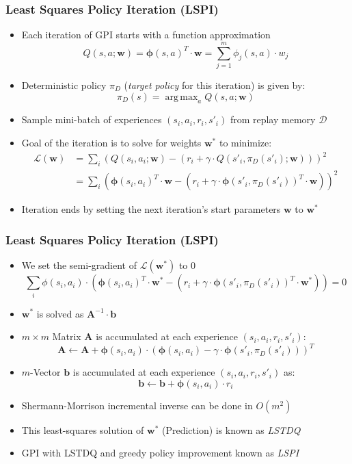 \documentclass[handout]{beamer}
\DeclareMathOperator*{\argmax}{arg\,max}
\begin{document}
\begin{frame}
\frametitle{Least Squares Policy Iteration (LSPI)}
\pause
\begin{itemize}[<+->]
\item Each iteration of GPI starts with a function approximation
$$Q(s,a; \bm{w}) = \bm{\phi}(s,a)^T \cdot \bm{w} = \sum_{j=1}^m \phi_j(s,a) \cdot w_j$$
\item Deterministic policy $\pi_D$ ({\em target policy} for this iteration) is given by:
$$\pi_D(s) = \argmax_a Q(s,a; \bm{w})$$
\item Sample mini-batch of experiences $(s_i,a_i,r_i,s'_i)$ from replay memory $\mathcal{D}$
\item Goal of the iteration is to solve for weights $\bm{w}^*$ to minimize:
\begin{align*}
\mathcal{L}(\bm{w}) & = \sum_i (Q(s_i,a_i; \bm{w}) - (r_i + \gamma \cdot Q(s'_i,\pi_D(s'_i); \bm{w})))^2\\
& = \sum_i (\bm{\phi}(s_i,a_i)^T \cdot \bm{w} - (r_i + \gamma \cdot \bm{\phi}(s'_i, \pi_D(s'_i))^T \cdot \bm{w}))^2
\end{align*}
\item Iteration ends by setting the next iteration's start parameters $\bm{w}$ to $\bm{w}^*$
\end{itemize}
\end{frame}

\begin{frame}
\frametitle{Least Squares Policy Iteration (LSPI)}
\pause
\begin{itemize}[<+->]
\item We set the semi-gradient of $\mathcal{L}(\bm{w}^*)$ to 0
\begin{equation}
\sum_i \phi(s_i,a_i) \cdot (\bm{\phi}(s_i,a_i)^T \cdot \bm{w}^* - (r_i + \gamma \cdot \bm{\phi}(s'_i, \pi_D(s'_i))^T \cdot \bm{w}^*)) = 0
\label{eq:lspi-loss-semi-gradient}
\end{equation}
\item $\bm{w}^*$ is solved as $\bm{A}^{-1} \cdot \bm{b}$
\item $m \times m$ Matrix $\bm{A}$ is accumulated at each experience $(s_i,a_i,r_i,s'_i)$:
$$ \bm{A} \leftarrow \bm{A} + \bm{\phi}(s_i, a_i) \cdot (\bm{\phi}(s_i, a_i) - \gamma \cdot \bm{\phi}(s'_i, \pi_D(s'_i)))^T $$
\item $m$-Vector $\bm{b}$ is accumulated at each experience $(s_i,a_i,r_i,s'_i)$ as:
$$\bm{b} \leftarrow \bm{b} + \bm{\phi}(s_i, a_i) \cdot r_i$$
\item Shermann-Morrison incremental inverse can be done in $O(m^2)$
\item This least-squares solution of $\bm{w}^*$ (Prediction) is known as {\em LSTDQ}
\item GPI with LSTDQ and greedy policy improvement known as {\em LSPI}
\end{itemize}
\end{frame}
\end{document}

